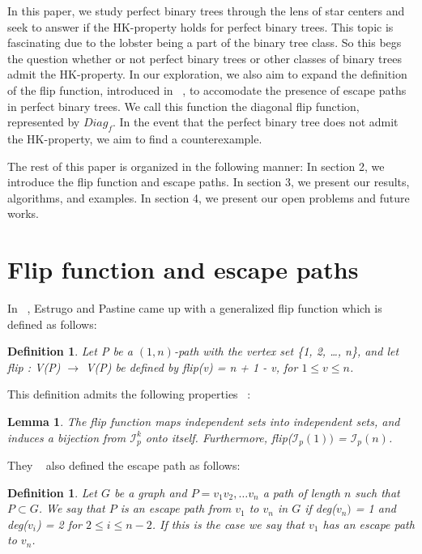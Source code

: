 \documentclass{amsart}
\newtheorem{lemma}[theorem]{Lemma}
\newtheorem{definition}[theorem]{Definition}
\theoremstyle{definition}
\begin{document}
In this paper, we study perfect binary trees through the lens of star centers and seek to answer if the HK-property holds for perfect binary trees. This topic is fascinating due to the lobster being a part of the binary tree class. So this begs the question whether or not perfect binary trees or other classes of binary trees admit the HK-property. In our exploration, we also aim to expand the definition of the flip function, introduced in ~\cite{MR2763040}, to accomodate the presence of escape paths in perfect binary trees. We call this function the diagonal flip function, represented by $Diag_{f}$. In the event that the perfect binary tree does not admit the HK-property, we aim to find a counterexample.

The rest of this paper is organized in the following manner:
In section 2, we introduce the flip function and escape paths. In section 3, we present our results, algorithms, and examples. In section 4, we present our open problems and future works.

\section{Flip function and escape paths}

In ~\cite{MR4245360}, Estrugo and Pastine came up with a generalized flip function which is defined as follows:

\begin{definition}
  Let P be a $(1,n)$-path with the vertex set \{1, 2, \ldots, n\}, and let flip : V(P) $\rightarrow$ V(P) be defined by flip(v) = n + 1 - v, for $1\leq v \leq n$.
\end{definition}

This definition admits the following properties ~\cite{MR4245360}:
\begin{lemma}
  The flip function maps independent sets into independent sets, and induces a bijection from $\mathcal{I}^k_p$ onto itself. Furthermore, flip($\mathcal{I}_p(1))$ = $\mathcal{I}_p(n)$.
\end{lemma}

They ~\cite{MR4245360} also defined the escape path as follows:

\begin{definition}
  Let $G$ be a graph and $P = v_1v_2, \ldots v_n$ a path of length $n$ such that $P \subset G$. We say that $P$ is an escape path from $v_1$ to $v_n$ in $G$ if deg($v_n)$ = 1 and deg($v_i$) = 2 for $2 \leq i \leq n-2$. If this is the case we say that $v_1$ has an escape path to $v_n$.
\end{definition}
\end{document}
